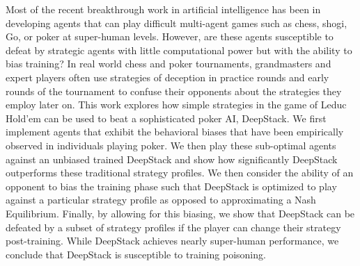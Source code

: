 \documentclass[10pt]{article}
\begin{document}
\printAffiliationsAndNotice{}  %
Most of the recent breakthrough work in artificial intelligence has been in developing agents that can play difficult multi-agent games such as chess, shogi, Go, or poker at super-human levels. However, are these agents susceptible to defeat by strategic agents with little computational power but with the ability to bias training? In real world chess and poker tournaments, grandmasters and expert players often use strategies of deception in practice rounds and early rounds of the tournament to confuse their opponents about the strategies they employ later on. This work explores how simple strategies in the game of Leduc Hold’em can be used to beat a sophisticated poker AI, DeepStack. We first implement agents that exhibit the behavioral biases that have been empirically observed in individuals playing poker. We then play these sub-optimal agents against an unbiased trained DeepStack and show how significantly DeepStack outperforms these traditional strategy profiles. We then consider the ability of an opponent to bias the training phase such that DeepStack is optimized to play against a particular strategy profile as opposed to approximating a Nash Equilibrium. Finally, by allowing for this biasing, we show that DeepStack can be defeated by a subset of strategy profiles if the player can change their strategy post-training. While DeepStack achieves nearly super-human performance, we conclude that DeepStack is susceptible to training poisoning.
\end{document}
